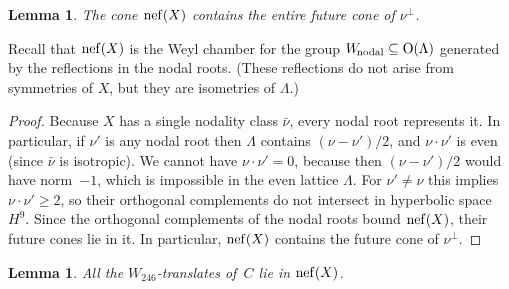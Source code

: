 \documentclass[12pt]{amsart}
\def\Wnodal{W_{\scriptstyle\rm\!nodal}}
\def\nef{\mathop{\rm nef}\nolimits}
\def\Orth{{\rm O}}
\def\nubar{{\bar{\nu}}}
\def\sset{\subseteq}
\numberwithin{theorem}{section}
\numberwithin{equation}{section}
\numberwithin{figure}{section}
\newtheorem{lemma}[theorem]{Lemma}
\theoremstyle{remark}
\begin{document}
\begin{lemma}
  \label{lem-nef-cone-contains-future-cone-of-nu-perp}
  The cone $\nef(X)$ contains the entire future cone of $\nu^\perp$.
\end{lemma}

  Recall that $\nef(X)$ is the Weyl chamber for the group
  $\Wnodal\sset\Orth(\Lambda)$ generated by the reflections in the nodal
  roots.  (These reflections do not arise from symmetries of $X$, but
  they are isometries of $\Lambda$.)

  \begin{proof}
  Because $X$ has a single nodality class $\nubar$, every nodal root
  represents it.  In particular, if $\nu'$ is any nodal root then
  $\Lambda$ contains $(\nu-\nu')/2$, and \hbox{$\nu\cdot\nu'$} is even (since
  $\nubar$ is isotropic).  We cannot have $\nu\cdot\nu'=0$, because
  then $(\nu-\nu')/2$ would have norm~$-1$, which is impossible in the
  even lattice $\Lambda$.  For $\nu'\neq\nu$ this implies $\nu\cdot\nu'\geq2$, so
  their orthogonal complements do not intersect in
  hyperbolic space $H^9$.  Since the orthogonal complements of the
  nodal roots bound $\nef(X)$,  their future cones lie
  in it.  In particular, $\nef(X)$ contains the future cone of $\nu^\perp$.
\end{proof}

\begin{lemma}
\label{lem-nef-cone-contains-246-translates-of-C}
  All the $W_{246}$-translates of~$C$ lie in $\nef(X)$.
\end{lemma}
\end{document}
